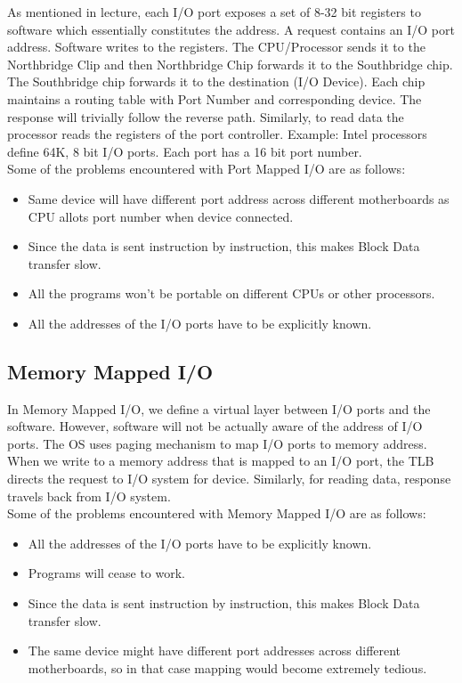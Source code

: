 \documentclass[12pt]{article}
\begin{document}
As mentioned in lecture, each I/O port exposes a set of 8-32 bit registers to software which essentially constitutes the address. A request contains an I/O port address. Software writes to the registers. The CPU/Processor sends it to the Northbridge Clip and then Northbridge Chip forwards it to the Southbridge chip. The Southbridge chip forwards it to the destination (I/O Device). Each chip maintains a routing table with Port Number and corresponding device. The response will trivially follow the reverse path. Similarly, to read data the processor reads the registers of the port controller. Example: Intel processors define 64K, 8 bit I/O ports. Each port has a 16 bit port number. \\

Some of the problems encountered with Port Mapped I/O are as follows:
\begin{itemize}
    \item Same device will have different port address across different motherboards as CPU allots port number when device connected.
    \item Since the data is sent instruction by instruction, this makes Block Data transfer slow.
    \item All the programs won't be portable on different CPUs or other processors.
    \item All the addresses of the I/O ports have to be explicitly known.
\end{itemize}

\subsection{Memory Mapped I/O}
In Memory Mapped I/O, we define a virtual layer between I/O ports and the software. However, software will not be actually aware of the address of I/O ports. The OS uses paging mechanism to map I/O ports to memory address. When we write to a memory address that is mapped to an I/O port, the TLB directs the request to I/O system for device. Similarly, for reading data, response travels back from I/O system. \\

Some of the problems encountered with Memory Mapped I/O are as follows:
\begin{itemize}
    \item All the addresses of the I/O ports have to be explicitly known.
    \item Programs will cease to work.
    \item Since the data is sent instruction by instruction, this makes Block Data transfer slow.
    \item The same device might have different port addresses across different motherboards, so in that case mapping would become extremely tedious.
\end{itemize}
\end{document}
